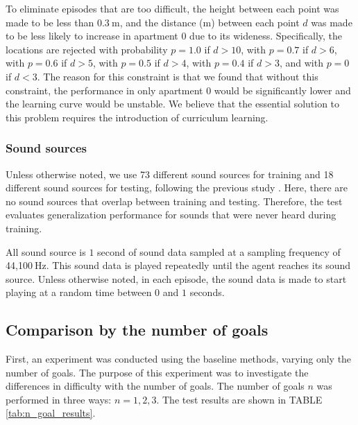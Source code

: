 To eliminate episodes that are too difficult, the height between each point was made to be less than $0.3\ \mathrm{m}$, and the distance (m) between each point $d$ was made to be less likely to increase in apartment 0 due to its wideness.
Specifically, the locations are rejected with probability $p=1.0$ if $d>10$, with $p=0.7$ if $d>6$, with $p=0.6$ if $d>5$, with $p=0.5$ if $d>4$, with $p=0.4$ if $d>3$, and with $p=0$ if $d<3$.
The reason for this constraint is that we found that without this constraint, the performance in only apartment 0 would be significantly lower and the learning curve would be unstable.
We believe that the essential solution to this problem requires the introduction of curriculum learning.




\subsubsection{Sound sources}
Unless otherwise noted, we use 73 different sound sources for training and 18 different sound sources for testing, following the previous study \cite{chen2020soundspaces}.
Here, there are no sound sources that overlap between training and testing.
Therefore, the test evaluates generalization performance for sounds that were never heard during training.

All sound source is $1$ second of sound data sampled at a sampling frequency of 44,100$\ \mathrm{Hz}$.
This sound data is played repeatedly until the agent reaches its sound source.
Unless otherwise noted, in each episode, the sound data is made to start playing at a random time between $0$ and $1$ seconds.


\subsection{Comparison by the number of goals}
\label{comparison-by-the-number-of-goals}
First, an experiment was conducted using the baseline methods, varying only the number of goals.
The purpose of this experiment was to investigate the differences in difficulty with the number of goals.
The number of goals $n$ was performed in three ways: $n=1,2,3$.
The test results are shown in TABLE \ref{tab:n_goal_results}.


